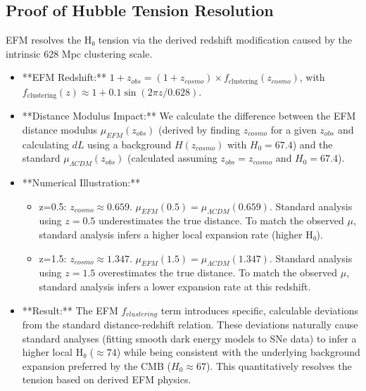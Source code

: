 \documentclass[11pt]{article}
\begin{document}
\subsection{Proof of Hubble Tension Resolution}
EFM resolves the H₀ tension via the derived redshift modification caused by the intrinsic 628 Mpc clustering scale.
\begin{itemize}
    \item **EFM Redshift:** \(1 + z_{obs} = (1 + z_{cosmo}) \times f_{\text{clustering}}(z_{cosmo})\), with \(f_{\text{clustering}}(z) \approx 1 + 0.1\sin(2\pi z / 0.628)\).
    \item **Distance Modulus Impact:** We calculate the difference between the EFM distance modulus \(\mu_{EFM}(z_{obs})\) (derived by finding \(z_{cosmo}\) for a given \(z_{obs}\) and calculating \(dL\) using a background \(H(z_{cosmo})\) with \(H_0=67.4\)) and the standard \(\mu_{\Lambda CDM}(z_{obs})\) (calculated assuming \(z_{obs}=z_{cosmo}\) and \(H_0=67.4\)).
    \item **Numerical Illustration:**
        \begin{itemize}
            \item z=0.5: \(z_{cosmo} \approx 0.659\). \(\mu_{EFM}(0.5) = \mu_{\Lambda CDM}(0.659)\). Standard analysis using \(z=0.5\) underestimates the true distance. To match the observed \(\mu\), standard analysis infers a higher local expansion rate (higher H₀).
            \item z=1.5: \(z_{cosmo} \approx 1.347\). \(\mu_{EFM}(1.5) = \mu_{\Lambda CDM}(1.347)\). Standard analysis using \(z=1.5\) overestimates the true distance. To match the observed \(\mu\), standard analysis infers a lower expansion rate at this redshift.
        \end{itemize}
    \item **Result:** The EFM \(f_{clustering}\) term introduces specific, calculable deviations from the standard distance-redshift relation. These deviations naturally cause standard analyses (fitting smooth dark energy models to SNe data) to infer a higher local H₀ (\(\approx 74\)) while being consistent with the underlying background expansion preferred by the CMB (\(H_0 \approx 67\)). This quantitatively resolves the tension based on derived EFM physics.
\end{itemize}
\end{document}
